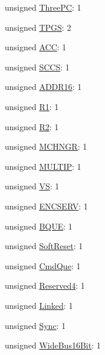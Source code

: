 \begin{DoxyCompactItemize}
\item 
unsigned \hyperlink{struct_inquiry_response_a48b774030b80f98823e9b38aba8a625d}{\-Three\-P\-C}\-: 1
\item 
unsigned \hyperlink{struct_inquiry_response_ada0ff6b78ecefa9b00bbe4e518ca4870}{\-T\-P\-G\-S}\-: 2
\item 
unsigned \hyperlink{struct_inquiry_response_a5b8449c749fe6290adc3bf0901697fbb}{\-A\-C\-C}\-: 1
\item 
unsigned \hyperlink{struct_inquiry_response_a3ed45a85bce19a76850cf5085ab35187}{\-S\-C\-C\-S}\-: 1
\item 
unsigned \hyperlink{struct_inquiry_response_ada87cc4b574b2d9dcce27c6837ee09a3}{\-A\-D\-D\-R16}\-: 1
\item 
unsigned \hyperlink{struct_inquiry_response_a72abbdbd399647227ea05cb1cec32b2d}{\-R1}\-: 1
\item 
unsigned \hyperlink{struct_inquiry_response_aa635575deb7f984d27142ee2071af5b3}{\-R2}\-: 1
\item 
unsigned \hyperlink{struct_inquiry_response_ac4236ae883e8948bc73e91b6ad091ba8}{\-M\-C\-H\-N\-G\-R}\-: 1
\item 
unsigned \hyperlink{struct_inquiry_response_a6a3fdde354529eb47ea3f43975bc224d}{\-M\-U\-L\-T\-I\-P}\-: 1
\item 
unsigned \hyperlink{struct_inquiry_response_a9a6c47a45be5bd1ce230c9fac3cc9bbd}{\-V\-S}\-: 1
\item 
unsigned \hyperlink{struct_inquiry_response_a6b4df8c5346c15186c9f200997bfb287}{\-E\-N\-C\-S\-E\-R\-V}\-: 1
\item 
unsigned \hyperlink{struct_inquiry_response_af735c28637c0ebc8f3e8a04f7b3023cc}{\-B\-Q\-U\-E}\-: 1
\item 
unsigned \hyperlink{struct_inquiry_response_ac912c8788475256de0bb7139e4a9f069}{\-Soft\-Reset}\-: 1
\item 
unsigned \hyperlink{struct_inquiry_response_a335e2997167a36347d717e1ed997f9be}{\-Cmd\-Que}\-: 1
\item 
unsigned \hyperlink{struct_inquiry_response_ae5c315ca0c47104b17d5bde7c4d485a6}{\-Reserved4}\-: 1
\item 
unsigned \hyperlink{struct_inquiry_response_ac0ee71a9c07b0c1fd9ff09461a81fa0e}{\-Linked}\-: 1
\item 
unsigned \hyperlink{struct_inquiry_response_ac70c33310966b01936cd0c3ab7477c83}{\-Sync}\-: 1
\item 
unsigned \hyperlink{struct_inquiry_response_a39a63fd0fd92c50370af9aefe93c13cf}{\-Wide\-Bus16\-Bit}\-: 1

\end{DoxyCompactItemize}
